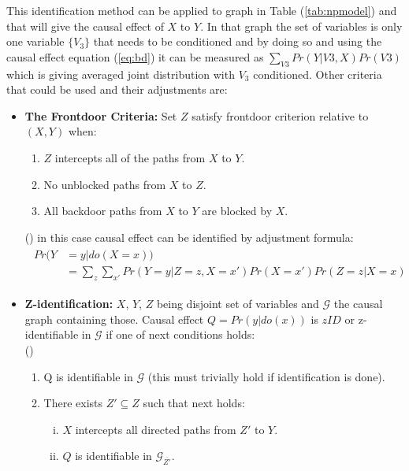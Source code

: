 \documentclass[main=english,12pt,a4paper,pdftex,econ,utf8]{aaltothesis}
\newcommand{\g}{\mathcal{G}}
\begin{document}
\noindent This identification method can be applied to graph in Table (\ref{tab:npmodel}) and that will give the causal effect of $X$ to $Y$. In that graph the set of variables is only one variable $\{V_{3}\}$ that needs to be conditioned and by doing so and using the causal effect equation (\ref{eq:bd}) it can be measured as $\sum_{V3}Pr(Y|V3,X)Pr(V3)$ which is giving averaged joint distribution with $V_{3}$ conditioned. Other criteria that could be used and their adjustments are:

\begin{itemize}
    \item[] \textbf{The Frontdoor Criteria:} Set $Z$ satisfy frontdoor criterion relative to $(X,Y)$ when:
    \begin{enumerate}
        \item $Z$ intercepts all of the paths from $X$ to $Y$.
        \item No unblocked paths from $X$ to $Z$.
        \item All backdoor paths from $X$ to $Y$ are blocked by $X$.
    \end{enumerate}
    \vspace{-.2cm}
    (\cite{Pearl2016})
    in this case causal effect can be identified by adjustment formula:
    \begin{align} \label{eq:fd}
        \begin{split}
            Pr(Y&=y|do(X=x)) \\ 
            &=\sum_{z}\sum_{x'}Pr(Y=y|Z=z,X=x')Pr(X=x')Pr(Z=z|X=x)
        \end{split}
    \end{align}
    \item[] \textbf{Z-identification:} $X$, $Y$, $Z$ being disjoint set of variables and $\g$ the causal graph containing those. Causal effect $Q=Pr(y|do(x))$ is $zID$ or z-identifiable in $\g$ if one of next conditions holds: \\
    (\cite{Bareinboim2012})
    \begin{enumerate}
        \item Q is identifiable in $\g$ (this must trivially hold if identification is done).
        \item There exists $Z'\subseteq Z$ such that next holds:
        \begin{enumerate}[i.]
            \item $X$ intercepts all directed paths from $Z'$ to $Y$.
            \item $Q$ is identifiable in $\g_{\overline{Z'}}$.
        \end{enumerate}
    \end{enumerate}
\end{itemize}
\end{document}
